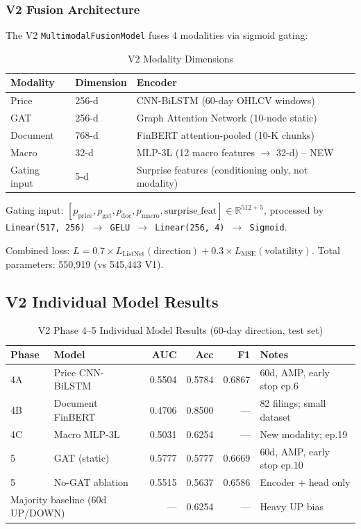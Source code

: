 \documentclass[12pt,a4paper]{article}
\begin{document}
\subsubsection{V2 Fusion Architecture}

The V2 \texttt{MultimodalFusionModel} fuses 4 modalities via sigmoid gating:

\begin{table}[H]
\centering
\caption{V2 Modality Dimensions}
\begin{tabular}{lll}
\toprule
\textbf{Modality} & \textbf{Dimension} & \textbf{Encoder} \\
\midrule
Price    & 256-d & CNN-BiLSTM (60-day OHLCV windows) \\
GAT      & 256-d & Graph Attention Network (10-node static) \\
Document & 768-d & FinBERT attention-pooled (10-K chunks) \\
Macro    & 32-d  & MLP-3L (12 macro features $\to$ 32-d) -- NEW \\
\midrule
Gating input & 5-d & Surprise features (conditioning only, not modality) \\
\bottomrule
\end{tabular}
\end{table}

Gating input: $[p_\text{price}, p_\text{gat}, p_\text{doc}, p_\text{macro}, \text{surprise\_feat}] \in \mathbb{R}^{512+5}$,
processed by \texttt{Linear(517, 256) $\to$ GELU $\to$ Linear(256, 4) $\to$ Sigmoid}.

Combined loss: $L = 0.7 \times L_{\text{ListNet}}(\text{direction}) + 0.3 \times L_{\text{MSE}}(\text{volatility})$.
Total parameters: 550,919 (vs 545,443 V1).

\subsection{V2 Individual Model Results}

\begin{table}[H]
\centering
\caption{V2 Phase 4--5 Individual Model Results (60-day direction, test set)}
\begin{tabular}{llrrrl}
\toprule
\textbf{Phase} & \textbf{Model} & \textbf{AUC} & \textbf{Acc} & \textbf{F1} & \textbf{Notes} \\
\midrule
4A & Price CNN-BiLSTM & 0.5504 & 0.5784 & 0.6867 & 60d, AMP, early stop ep.6 \\
4B & Document FinBERT  & 0.4706 & 0.8500 & ---    & 82 filings; small dataset \\
4C & Macro MLP-3L      & 0.5031 & 0.6254 & ---    & New modality; ep.19 \\
5  & GAT (static)      & 0.5777 & 0.5777 & 0.6669 & 60d, AMP, early stop ep.10 \\
5  & No-GAT ablation   & 0.5515 & 0.5637 & 0.6586 & Encoder + head only \\
\midrule
\multicolumn{2}{l}{Majority baseline (60d UP/DOWN)} & ---   & 0.6254 & --- & Heavy UP bias \\
\bottomrule
\end{tabular}
\end{table}
\end{document}
